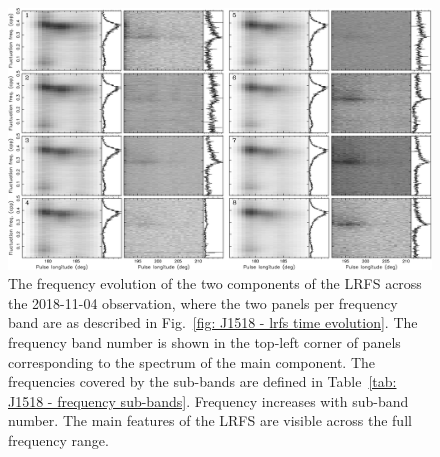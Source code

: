 \begin{landscape}
    \begin{figure}
        \begin{center}
            \includegraphics[width=0.82\textheight]{Figures/J1518/lrfs_freq_evolution_2}
            \caption[Frequency evolution of the LRFS]{The frequency evolution of the two components of the LRFS across the 2018-11-04 observation, where the two panels per frequency band are as described in Fig.~\ref{fig: J1518 - lrfs time evolution}. The frequency band number is shown in the top-left corner of panels corresponding to the spectrum of the main component. The frequencies covered by the sub-bands are defined in Table~\ref{tab: J1518 - frequency sub-bands}. Frequency increases with sub-band number. The main features of the LRFS are visible across the full frequency range.}
            \label{fig: J1518 - lrfs freq evolution}
        \end{center}
    \end{figure}
\end{landscape}




